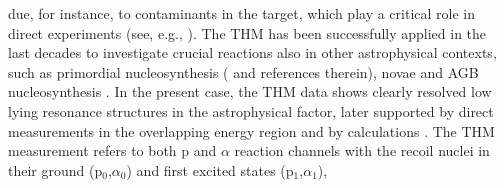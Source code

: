 \documentclass{aastex631}
\begin{document}
due, for instance, to contaminants in the target, which play a critical role in direct
experiments (see, e.g., \citet{fr20}). 
The THM has been successfully applied in the last decades to investigate crucial reactions also in other astrophysical contexts, such as primordial nucleosynthesis (\citet{lamia19,sparta20} and references therein), %
novae \citep{laco17} and AGB nucleosynthesis \citep{Pizzone17}. 
In the present case, the THM data shows clearly resolved low lying resonance structures in the astrophysical factor, %
later supported by direct
measurements in the overlapping energy region \citep{fr20} and by calculations \citep{bn20}. The THM measurement refers to both  
p and $\alpha$ reaction channels with the recoil nuclei in their ground (p$_0$,$\alpha_0$) and first excited states (p$_1$,$\alpha_1$),
\end{document}

